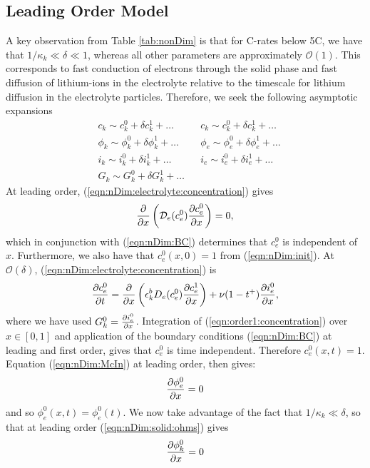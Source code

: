 \documentclass[preprint]{elsarticle}
\begin{document}
\subsection{Leading Order Model}
A key observation from Table \ref{tab:nonDim} is that for C-rates below 5C, we have that $1/\kappa_k \ll \delta \ll 1$, whereas all other parameters are approximately $\mathcal{O}(1)$. This corresponds to fast conduction of electrons through the solid phase and fast diffusion of lithium-ions in the electrolyte relative to the timescale for lithium diffusion in the electrolyte particles. Therefore, we seek the following asymptotic expansions
\begin{align*} 
	&c_k \sim c_k^0 + \delta c_k^1 + \dots \ \ 
    &&c_k \sim c_k^0 + \delta c_k^1 + \dots \\ 
    &\phi_k \sim \phi_k^0 + \delta \phi_k^1 + \dots \ \ 
    &&\phi_e \sim \phi_e^0 + \delta \phi_e^1 + \dots \\
    &i_k \sim i_k^0 + \delta i_k^1 + \dots \ \ 
    &&i_e \sim i_e^0 + \delta i_e^1 + \dots \\    
     &G_k \sim G_k^0 + \delta G_k^1 + \dots 
\end{align*}
At leading order, (\ref{eqn:nDim:electrolyte:concentration}) gives
\begin{equation}
	\pdv{x}\left(\mathcal{D}_e(c_e^0) \pdv{c_e^0}{x}\right) = 0, 
\end{equation}
which in conjunction with (\ref{eqn:nDim:BC}) determines that $c_e^0$ is independent of $x$. Furthermore, we also have that $c_e^0(x,0)=1$ from (\ref{eqn:nDim:init}). At $\mathcal{O}(\delta)$, (\ref{eqn:nDim:electrolyte:concentration}) is
\begin{equation}\label{eqn:order1:concentration} 
	\pdv{c_e^0}{t} = \pdv{x} \left(\epsilon_k^b D_e(c_e^0)\pdv{c_e^1}{x} \right) + \nu (1-t^+) \pdv{i_e^0}{x},
\end{equation} 
where we have used $G_k^0 = \pdv{i_e^0}{x}$. Integration of (\ref{eqn:order1:concentration}) over $x\in[0,1]$ and application of the boundary conditions (\ref{eqn:nDim:BC}) at leading and first order, gives that $c_e^0$ is time independent. Therefore $c_e^0(x,t)=1$. Equation (\ref{eqn:nDim:McIn}) at leading order, then gives: 
\begin{equation}
	\pdv{\phi_e^0}{x} = 0 
\end{equation}
and so $\phi_e^0(x,t) = \phi_e^0(t)$. We now take advantage of the fact that $1/\kappa_k \ll \delta$, so that at leading order (\ref{eqn:nDim:solid:ohms}) gives 
\begin{equation}
	\pdv{\phi_k^0}{x} = 0 
\end{equation}
\end{document}
